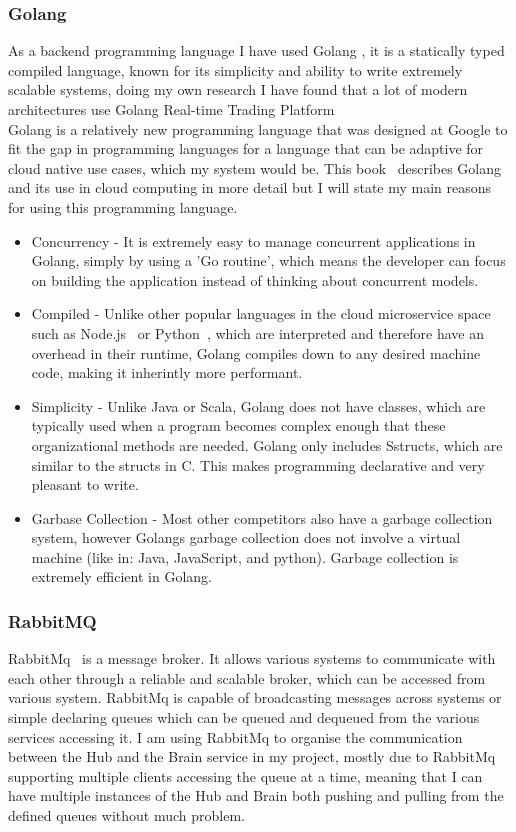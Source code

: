 \documentclass[titlepage]{article}
\begin{document}
\subsubsection{Golang}
As a backend programming language I have used Golang , it is a statically typed compiled language, known for its simplicity and ability to write extremely scalable systems, doing my own research I have found that a lot of modern architectures use Golang Real-time Trading Platform \\

Golang is a relatively new programming language that was designed at Google to fit the gap in programming languages for a language that can be adaptive for cloud native use cases, which my system would be. This book~\cite{andrawos2017cloud} describes Golang and its use in cloud computing in more detail but I will state my main reasons for using this programming language.

\begin{itemize}
  \item Concurrency - It is extremely easy to manage concurrent applications in Golang, simply by using a 'Go routine', which means the developer can focus on building the application instead of thinking about concurrent models.
  \item Compiled - Unlike other popular languages in the cloud microservice space such as Node.js~\cite{nodejs} or Python~\cite{python}, which are interpreted and therefore have an overhead in their runtime, Golang compiles down to any desired machine code, making it inherintly more performant.
  \item Simplicity - Unlike Java or Scala, Golang does not have classes, which are typically used when a program becomes complex enough that these organizational methods are needed. Golang only includes Sstructs, which are similar to the structs in C. This makes programming declarative and very pleasant to write.
  \item Garbase Collection - Most other competitors also have a garbage collection system, however Golangs garbage collection does not involve a virtual machine (like in: Java, JavaScript, and python). Garbage collection is extremely efficient in Golang.
\end{itemize}

\subsubsection{RabbitMQ}
RabbitMq~\cite{rabbitmq} is a message broker. It allows various systems to communicate with each other through a reliable and scalable broker, which can be accessed from various system. RabbitMq is capable of broadcasting messages across systems or simple declaring queues which can be queued and dequeued from the various services accessing it. I am using RabbitMq to organise the communication between the Hub and the Brain service in my project, mostly due to RabbitMq supporting multiple clients accessing the queue at a time, meaning that I can have multiple instances of the Hub and Brain both pushing and pulling from the defined queues without much problem.
\end{document}
